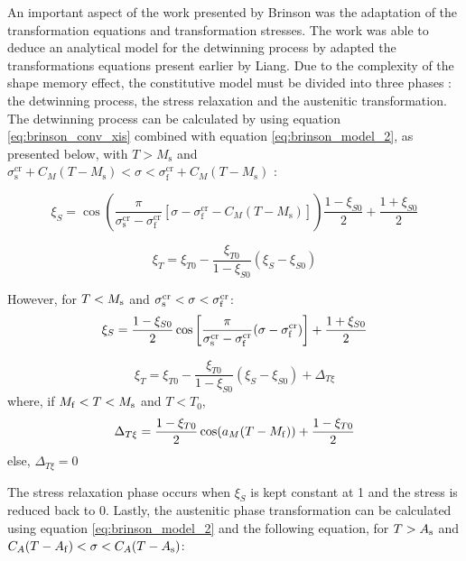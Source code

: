 An important aspect of the work presented by Brinson was the adaptation of the transformation equations and transformation stresses. The work was able to deduce an analytical model for the detwinning process by adapted the transformations equations present earlier by Liang. Due to the complexity of the shape memory effect, the constitutive model must be divided into three phases : the detwinning process, the stress relaxation and the austenitic transformation. The detwinning process can be calculated by using equation \ref{eq:brinson_conv_xis} combined with equation \ref{eq:brinson_model_2}, as presented below, with $T > M_\mathrm{s}$ and $\sigma_\mathrm{s}^\mathrm{cr} + C_M(T - M_\mathrm{s}) < \sigma < \sigma_\mathrm{f}^\mathrm{cr} + C_M(T-M_\mathrm{s})$ :

\begin{equation}
  \label{eq:brinson_conv_xis}
  \xi_S = \cos\left(\frac{\pi}{\sigma_\mathrm{s}^\mathrm{cr}-\sigma_\mathrm{f}^\mathrm{cr}}[\sigma - \sigma_\mathrm{f}^\mathrm{cr} - C_M(T-M_\mathrm{s})]\right)\frac{1-\xi_{S0}}{2} + \frac{1+\xi_{S0}}{2}
\end{equation}

\begin{equation}
  \label{eq:brinson_conv_xit}
  \xi_T = \xi_{T0} - \frac{\xi_{T0}}{1-\xi_{S0}}(\xi_S-\xi_{S0})
\end{equation}

However, for $T<M_\mathrm{s}$ and $\sigma_\mathrm{s}^\mathrm{cr}<\sigma<\sigma_\mathrm{f}^\mathrm{cr}$:
\begin{equation}
  \label{eq:brinson_conv_xis1}
  \xi_S = \frac{1-\xi_{S0}}{2}\cos\left[\frac{\pi}{\sigma_\mathrm{s}^\mathrm{cr}-\sigma_\mathrm{f}^\mathrm{cr}}(\sigma - \sigma_\mathrm{f}^\mathrm{cr})\right] + \frac{1+\xi_{S0}}{2}
\end{equation}

\begin{equation}
  \label{eq:brinson_conv_xit2}
  \xi_T = \xi_{T0} - \frac{\xi_{T0}}{1-\xi_{S0}}(\xi_S-\xi_{S0})+\Delta_{T\xi}
\end{equation}
where, if $M_\mathrm{f}<T<M_\mathrm{s}$ and $T<T_0$,
\begin{equation}
  \label{eq:deltaTxi}
  \Delta_{T\xi} = \frac{1-\xi_{T0}}{2}\cos(a_M(T-M_\mathrm{f}))+\frac{1-\xi_{T0}}{2}
\end{equation}
else, $\Delta_{T\xi}=0$

The stress relaxation phase occurs when $\xi_S$ is kept constant at 1 and the stress is reduced back to 0. Lastly, the austenitic phase transformation can be calculated using equation \ref{eq:brinson_model_2} and the following equation, for $T>A_\mathrm{s}$ and $C_A(T-A_\mathrm{f})<\sigma<C_A(T-A_\mathrm{s})$:

